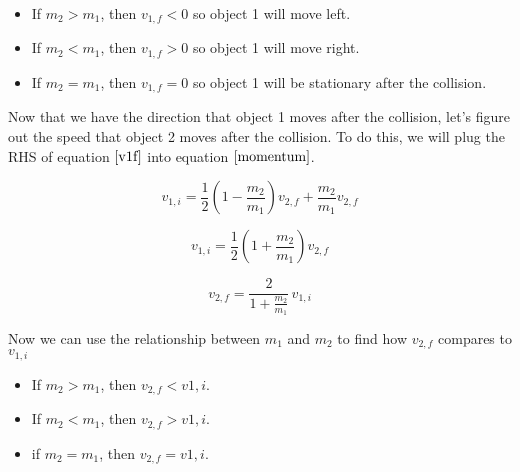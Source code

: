 \documentclass{article}
\begin{document}
\begin{itemize}
	\item If $m_2 > m_1$, then $v_{1,f} < 0$ so object 1 will move left.
	\item If $m_2 < m_1$, then $v_{1,f} > 0$ so object 1 will move right.
	\item If $m_2 = m_1$, then $v_{1,f} = 0$ so object 1 will be stationary after the collision.
\end{itemize}

Now that we have the direction that object 1 moves after the collision, let's figure out the speed that object 2 moves after the collision. To do this, we will plug the RHS of equation $\ref{v1f}$ into equation $\ref{momentum}$.

\begin{equation}
	v_{1,i} = \frac{1}{2} \left( 1 - \frac{m_2}{m_1} \right) v_{2,f} + \frac{m_2}{m_1} v_{2,f}
\end{equation}

\begin{equation}
	v_{1,i} = \frac{1}{2} \left( 1 + \frac{m_2}{m_1} \right) v_{2,f}
\end{equation}

\begin{equation}
	v_{2,f} = \frac{2}{1 + \frac{m_2}{m_1}} \, v_{1,i}
\end{equation}

Now we can use the relationship between $m_1$ and $m_2$ to find how $v_{2,f}$ compares to $v_{1,i}$

\begin{itemize}
	\item If $m_2 > m_1$, then $v_{2,f} < v{1,i}$.
	\item If $m_2 < m_1$, then $v_{2,f} > v{1,i}$.
	\item if $m_2 = m_1$, then $v_{2,f} = v{1,i}$.
\end{itemize}
\end{document}
